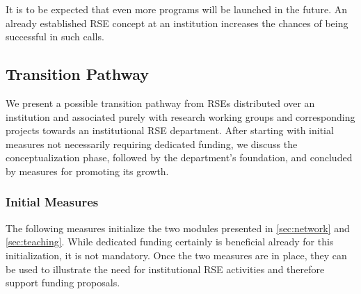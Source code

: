 \documentclass[a4paper]{article}
\begin{document}
\begin{enumerate}
      It is to be expected that even more programs will be launched in the future.
      An already established RSE concept at an institution increases the chances of being successful in such calls.
\end{enumerate}


\subsection{Transition Pathway}

We present a possible transition pathway from RSEs distributed over an institution and associated purely with research working groups and corresponding projects towards an institutional RSE department.
After starting with initial measures not necessarily requiring dedicated funding, we discuss the conceptualization phase, followed by the department's foundation, and concluded by measures for promoting its growth.

\subsubsection{Initial Measures}
The following measures initialize the two modules presented in \autoref{sec:network} and \autoref{sec:teaching}.
While dedicated funding certainly is beneficial already for this initialization, it is not mandatory.
Once the two measures are in place, they can be used to illustrate the need for institutional RSE activities and therefore support funding proposals.
\end{document}
